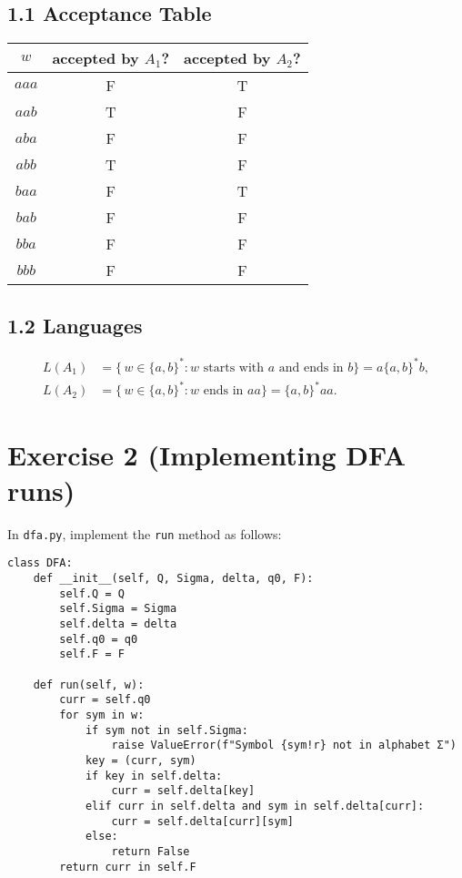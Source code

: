 \documentclass{article}
\begin{document}
\subsection*{1.1 Acceptance Table}
\begin{center}
\begin{tabular}{c|cc}
$w$ & accepted by $A_1$? & accepted by $A_2$? \\
\hline
$aaa$ & F & T \\
$aab$ & T & F \\
$aba$ & F & F \\
$abb$ & T & F \\
$baa$ & F & T \\
$bab$ & F & F \\
$bba$ & F & F \\
$bbb$ & F & F \\
\end{tabular}
\end{center}

\subsection*{1.2 Languages}
\begin{align*}
L(A_1) &= \{\,w\in\{a,b\}^*: w \text{ starts with }a\text{ and ends in }b\} = a\{a,b\}^*b,\\
L(A_2) &= \{\,w\in\{a,b\}^*: w \text{ ends in }aa\} = \{a,b\}^*aa.
\end{align*}

\section*{Exercise 2 (Implementing DFA runs)}
In \texttt{dfa.py}, implement the \texttt{run} method as follows:
\begin{verbatim}
class DFA:
    def __init__(self, Q, Sigma, delta, q0, F):
        self.Q = Q
        self.Sigma = Sigma
        self.delta = delta
        self.q0 = q0
        self.F = F

    def run(self, w):
        curr = self.q0
        for sym in w:
            if sym not in self.Sigma:
                raise ValueError(f"Symbol {sym!r} not in alphabet Σ")
            key = (curr, sym)
            if key in self.delta:
                curr = self.delta[key]
            elif curr in self.delta and sym in self.delta[curr]:
                curr = self.delta[curr][sym]
            else:
                return False
        return curr in self.F
\end{verbatim}
\end{document}
